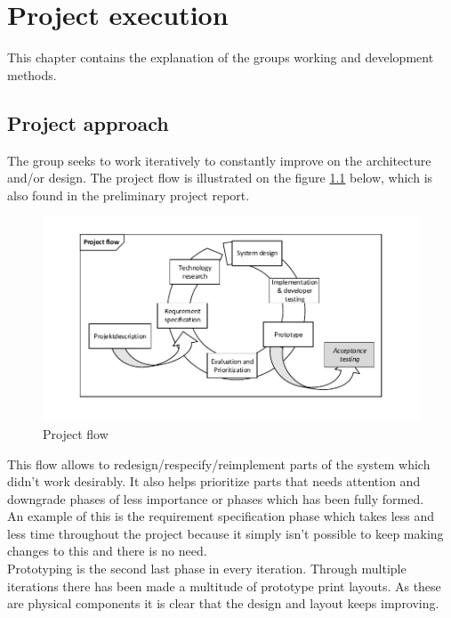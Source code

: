 \chapter{Project execution}
This chapter contains the explanation of the groups working and development methods.

\section{Project approach}
The group seeks to work iteratively to constantly improve on the architecture and/or design. The project flow is illustrated on the figure \ref{fig:projectflow} below, which is also found in the preliminary project report.
\begin{figure}[hbpt]
	\centering
	\includegraphics[width=1\textwidth]{billeder/9projectexecution/projectflow}
	\caption{Project flow}
	\label{fig:projectflow}
\end{figure}

This flow allows to redesign/respecify/reimplement parts of the system which didn't work desirably. It also helps prioritize parts that needs attention and downgrade phases of less importance or phases which has been fully formed.\\
An example of this is the requirement specification phase which takes less and less time throughout the project because it simply isn't possible to keep making changes to this and there is no need.\\
Prototyping is the second last phase in every iteration. Through multiple iterations there has been made a multitude of prototype print layouts. As these are physical components it is clear that the design and layout keeps improving.\\

